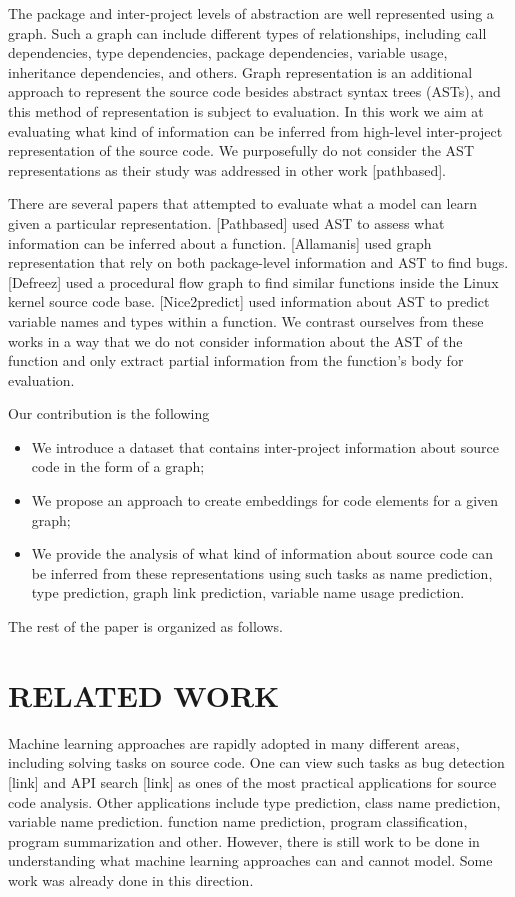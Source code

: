 \documentclass[a4paper,twoside]{article}
\begin{document}
The package and inter-project levels of abstraction are well represented using a graph. Such a graph can include different types of relationships, including call dependencies, type dependencies, package dependencies, variable usage, inheritance dependencies, and others. Graph representation is an additional approach to represent the source code besides abstract syntax trees (ASTs), and this method of representation is subject to evaluation. In this work we aim at evaluating what kind of information can be inferred from high-level inter-project representation of the source code. We purposefully do not consider the AST representations as their study was addressed in other work [pathbased].

There are several papers that attempted to evaluate what a model can learn given a particular representation. [Pathbased] used AST to assess what information can be inferred about a function. [Allamanis] used graph representation that rely on both package-level information and AST to find bugs. [Defreez] used a procedural flow graph to find similar functions inside the Linux kernel source code base. [Nice2predict] used information about AST to predict variable names and types within a function. We contrast ourselves from these works in a way that we do not consider information about the AST of the function and only extract partial information from the function's body for evaluation. 

Our contribution is the following
\begin{itemize}
    \item We introduce a dataset that contains inter-project information about source code in the form of a graph;
    \item We propose an approach to create embeddings for code elements for a given graph;
    \item We provide the analysis of what kind of information about source code can be inferred from these representations using such tasks as name prediction, type prediction, graph link prediction, variable name usage prediction.
\end{itemize}

The rest of the paper is organized as follows.

\section{\uppercase{Related Work}}

Machine learning approaches are rapidly adopted in many different areas, including solving tasks on source code. One can view such tasks as bug detection [link] and API search [link] as ones of the most practical applications for source code analysis. Other applications include type prediction, class name prediction, variable name prediction. function name prediction, program classification, program summarization and other.  However, there is still work to be done in understanding what machine learning approaches can and cannot model. Some work was already done in this direction. 
\end{document}
